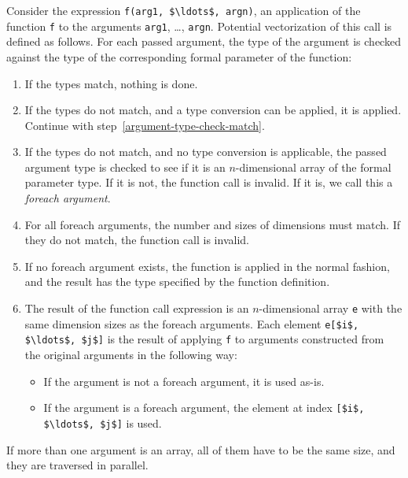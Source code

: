 Consider the expression \lstinline!f(arg1, $\ldots$, argn)!, an application of the function \lstinline!f! to the arguments \lstinline!arg1!, \ldots, \lstinline!argn!.
Potential vectorization of this call is defined as follows.
For each passed argument, the type of the argument is checked against the type of the corresponding formal parameter of the function:
\begin{enumerate}
\item\label{argument-type-check-match}
  If the types match, nothing is done.
\item
  If the types do not match, and a type conversion can be applied, it is
  applied. Continue with step~\ref{argument-type-check-match}.
\item
  If the types do not match, and no type conversion is applicable, the passed argument type is checked to see if it is an $n$-dimensional array of the formal parameter type.  If it is not, the function call is invalid.  If it is, we call this a \emph{foreach argument}.
\item
  For all foreach arguments, the number and sizes of dimensions must
  match. If they do not match, the function call is invalid.
\item
  If no foreach argument exists, the function is applied in the normal
  fashion, and the result has the type specified by the function
  definition.
\item
  The result of the function call expression is an $n$-dimensional array \lstinline!e! with the same dimension sizes as the foreach arguments.
  Each element \lstinline!e[$i$, $\ldots$, $j$]! is the result of applying \lstinline!f! to arguments constructed from the original arguments in the following way:
\begin{itemize}
\item
  If the argument is not a foreach argument, it is used as-is.
\item
  If the argument is a foreach argument, the element at index \lstinline![$i$, $\ldots$, $j$]! is used.
\end{itemize}
\end{enumerate}

If more than one argument is an array, all of them have to be the same
size, and they are traversed in parallel.

